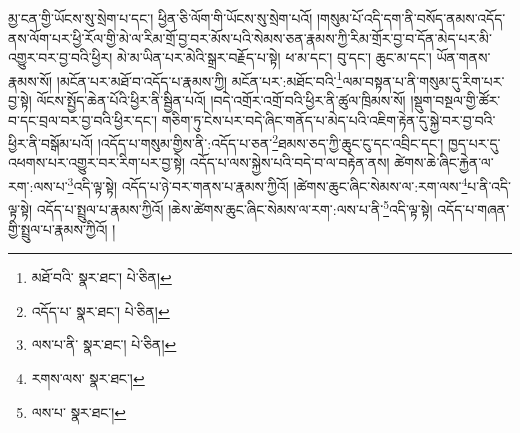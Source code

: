 མྱ་ངན་གྱི་ཡོངས་སུ་སྲེག་པ་དང་། ཕྱིན་ཅི་ལོག་གི་ཡོངས་སུ་སྲེག་པའོ། །གསུམ་པོ་འདི་དག་ནི་བསོད་ནམས་འདོད་ནས་ལོག་པར་ཕྱི་རོལ་གྱི་མེ་ལ་རིམ་གྲོ་བྱ་བར་མོས་པའི་སེམས་ཅན་རྣམས་ཀྱི་རིམ་གྲོར་བྱ་བ་དོན་མེད་པར་མི་འགྱུར་བར་བྱ་བའི་ཕྱིར། མེ་མ་ཡིན་པར་མེའི་སྒྲར་བརྗོད་པ་སྟེ། ཕ་མ་དང་། བུ་དང་། ཆུང་མ་དང་། ཡོན་གནས་རྣམས་སོ། །མངོན་པར་མཐོ་བ་འདོད་པ་རྣམས་ཀྱི། མངོན་པར་:མཐོང་བའི་\footnote{མཐོ་བའི་  སྣར་ཐང་།  པེ་ཅིན། }ལམ་བསྟན་པ་ནི་གསུམ་དུ་རིག་པར་བྱ་སྟེ། ལོངས་སྤྱོད་ཆེན་པོའི་ཕྱིར་ནི་སྦྱིན་པའོ། །བདེ་འགྲོར་འགྲོ་བའི་ཕྱིར་ནི་ཚུལ་ཁྲིམས་སོ། །སྡུག་བསྔལ་གྱི་ཚོར་བ་དང་བྲལ་བར་བྱ་བའི་ཕྱིར་དང་། གཅིག་ཏུ་ངེས་པར་བདེ་ཞིང་གནོད་པ་མེད་པའི་འཇིག་རྟེན་དུ་སྐྱེ་བར་བྱ་བའི་ཕྱིར་ནི་བསྒོམ་པའོ། །འདོད་པ་གསུམ་གྱིས་ནི་:འདོད་པ་ཅན་\footnote{འདོད་པ་  སྣར་ཐང་།  པེ་ཅིན། }ཐམས་ཅད་ཀྱི་ཆུང་ངུ་དང་འབྲིང་དང་། ཁྱད་པར་དུ་འཕགས་པར་འགྱུར་བར་རིག་པར་བྱ་སྟེ། འདོད་པ་ལས་སྐྱེས་པའི་བདེ་བ་ལ་བརྟེན་ནས། ཚེགས་ཆེ་ཞིང་རྐྱེན་ལ་རག་:ལས་པ་\footnote{ལས་པ་ནི་  སྣར་ཐང་།  པེ་ཅིན། }འདི་ལྟ་སྟེ། འདོད་པ་ཉེ་བར་གནས་པ་རྣམས་ཀྱིའོ། །ཚེགས་ཆུང་ཞིང་སེམས་ལ་:རག་ལས་\footnote{རགས་ལས་  སྣར་ཐང་། }པ་ནི་འདི་ལྟ་སྟེ། འདོད་པ་སྤྲུལ་པ་རྣམས་ཀྱིའོ། །ཆེས་ཚེགས་ཆུང་ཞིང་སེམས་ལ་རག་:ལས་པ་ནི་\footnote{ལས་པ་  སྣར་ཐང་། }འདི་ལྟ་སྟེ། འདོད་པ་གཞན་གྱི་སྤྲུལ་པ་རྣམས་ཀྱིའོ། །
